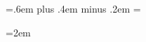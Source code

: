 

\spaceskip=.6em plus .4em minus .2em
\xspaceskip=\spaceskip


\emergencystretch=2em



\makeatletter
\renewcommand{\@makefnmark}{\hbox{\textsuperscript{\normalfont\@thefnmark}}}

\renewcommand{\@makefntext}[1]{%
  \parindent 1em%
  \noindent
  \hb@xt@1.8em{\hss\textsuperscript{\normalfont\@thefnmark}}#1%
}
\makeatother


\makeatletter
{}
\makeatother


\newcount\lwpenalty
{}
\newcommand{\lw}[1]{#1\penalty\lwpenalty\hskip 0pt plus .12em minus .04em\relax}


